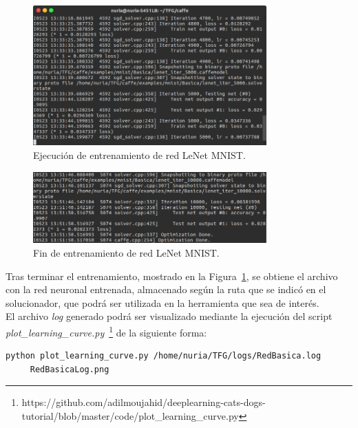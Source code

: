 	\begin{figure}[H]
		\begin{center}
			\includegraphics[width=0.8\textwidth]{figures/RedBasica5000}
			\caption{Ejecución de entrenamiento de red LeNet MNIST.}
		\end{center}
	\end{figure}
	
	\begin{figure}[H]
		\begin{center}
			\includegraphics[width=0.8\textwidth]{figures/RedBasicaFin}
			\caption{Fin de entrenamiento de red LeNet MNIST.}
			\label{fig.finEntrBas}
		\end{center}
	\end{figure}
	
	Tras terminar el entrenamiento, mostrado en la Figura~\ref{fig.finEntrBas}, se obtiene el archivo con la red neuronal entrenada, almacenado según la ruta que se indicó en el solucionador, que podrá ser utilizada en la herramienta que sea de interés.\\

	El archivo \textit{log} generado podrá ser visualizado mediante la ejecución del script \textit{plot\_learning\_curve.py}~\footnote{https://github.com/adilmoujahid/deeplearning-cats-dogs-tutorial/blob/master/code/plot\_learning\_curve.py} de la siguiente forma:
	\vspace{10pt}
	\begin{lstlisting}[frame=single]
	python plot_learning_curve.py /home/nuria/TFG/logs/RedBasica.log 
	 RedBasicaLog.png
	\end{lstlisting}
	

